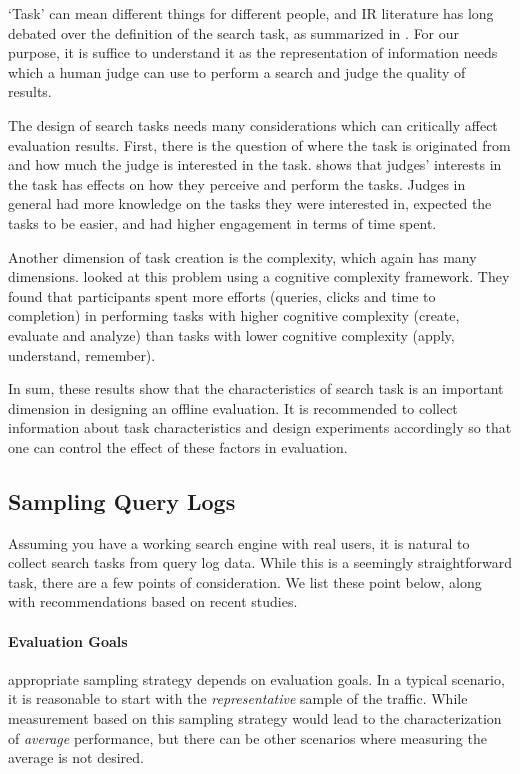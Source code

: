 \documentclass[openany]{now} %
\begin{document}
`Task' can mean different things for different people, and IR literature has long debated over the definition of the search task, as summarized in \cite{kelly2009methods}. For our purpose, it is suffice to understand it as the representation of information needs which a human judge can use to perform a search and judge the quality of results.

The design of search tasks needs many considerations which can critically affect evaluation results. First, there is the question of where the task is originated from and how much the judge is interested in the task. \cite{Edwards:2016} shows that judges' interests in the task has effects on how they perceive and perform the tasks. Judges in general had more knowledge on the tasks they were interested in, expected the tasks to be easier, and had higher engagement in terms of time spent.

Another dimension of task creation is the complexity, which again has many dimensions. \cite{Kelly:2015} looked at this problem using a cognitive complexity framework. They found that participants spent more efforts (queries, clicks and time to completion) in performing tasks with higher cognitive complexity (create, evaluate and analyze) than tasks with lower cognitive complexity (apply, understand, remember).

In sum, these results show that the characteristics of search task is an important dimension in designing an offline evaluation. It is recommended to collect information about task characteristics and design experiments accordingly so that one can control the effect of these factors in evaluation.

\subsection{Sampling Query Logs}
Assuming you have a working search engine with real users, it is natural to collect search tasks from query log data. While this is a seemingly straightforward task, there are a few points of consideration. We list these point below, along with recommendations based on recent studies.

\paragraph{Evaluation Goals} appropriate sampling strategy depends on evaluation goals. In a typical scenario, it is reasonable to start with the \textit{representative} sample of the traffic. While measurement based on this sampling strategy would lead to the characterization of \textit{average} performance, but there can be other scenarios where measuring the average is not desired. 
\end{document}
